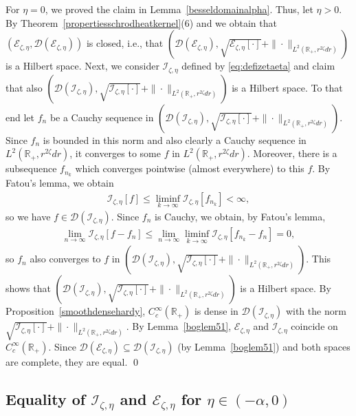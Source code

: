 \documentclass[12pt,reqno]{amsart}
\theoremstyle{definition}
\theoremstyle{remark}
\numberwithin{equation}{section}
\newcommand{\1}{\mathbbm{1}}
\newcommand{\D}{\mathcal{D}}
\newcommand{\R}{\mathbb{R}}
\def\ce{\mathcal{E}}
\def\ci{\mathcal{I}}
\begin{document}
For $\eta=0$, we proved the claim in Lemma~\ref{besseldomainalpha}. Thus, let $\eta>0$.
By Theorem~\ref{propertiesschrodheatkernel}(6) and \cite[Lemmas~1.3.2 and~1.3.4 and Theorem~1.3.1]{Fukushimaetal2011} we obtain that $(\ce_{\zeta,\eta},\D(\ce_{\zeta,\eta}))$ is closed, i.e., that $(\D(\ce_{\zeta,\eta}),\sqrt{\ce_{\zeta,\eta}[\cdot]}+\|\cdot\|_{L^2(\R_+,r^{2\zeta}dr)})$ is a Hilbert space.
%
Next, we consider $\ci_{\zeta,\eta}$ defined by \eqref{eq:defizetaeta} and claim that also $(\D(\ci_{\zeta,\eta}),\sqrt{\ci_{\zeta,\eta}[\cdot]}+\|\cdot\|_{L^2(\R_+,r^{2\zeta}dr)})$ is a Hilbert space. To that end let $f_n$ be a Cauchy sequence in $(\D(\ci_{\zeta,\eta}),\sqrt{\ci_{\zeta,\eta}[\cdot]}+\|\cdot\|_{L^2(\R_+,r^{2\zeta}dr)})$. Since $f_n$ is bounded in this norm and also clearly a Cauchy sequence in $L^2(\R_+,r^{2\zeta}dr)$, it converges to some $f$ in $L^2(\R_+,r^{2\zeta}dr)$. Moreover, there is a subsequence $f_{n_k}$ which converges pointwise (almost everywhere) to this $f$. By Fatou's lemma, we obtain
\begin{align}
  \ci_{\zeta,\eta}[f] \leq \liminf_{k\to\infty}\ci_{\zeta,\eta}[f_{n_k}] <\infty,
\end{align}
so we have $f\in\D(\ci_{\zeta,\eta})$. Since $f_n$ is Cauchy, we obtain, by Fatou's lemma,
\begin{align}
  \lim_{n\to\infty}\ci_{\zeta,\eta}[f-f_n]
  \leq \lim_{n\to\infty}\liminf_{k\to\infty} \ci_{\zeta,\eta}[f_{n_k}-f_n] = 0,
\end{align}
so $f_n$ also converges to $f$ in $(\D(\ci_{\zeta,\eta}),\sqrt{\ci_{\zeta,\eta}[\cdot]} + \|\cdot\|_{L^2(\R_+,r^{2\zeta}dr)})$. This shows that $(\D(\ci_{\zeta,\eta}),\sqrt{\ci_{\zeta,\eta}[\cdot]}+\|\cdot\|_{L^2(\R_+,r^{2\zeta}dr)})$ is a Hilbert space.
By Proposition~\ref{smoothdensehardy}, $C_c^\infty(\R_+)$ is dense in $\D(\ci_{\zeta,\eta})$ with the norm $\sqrt{\ci_{\zeta,\eta}[\cdot]}+\|\cdot\|_{L^2(\R_+,r^{2\zeta}dr)}$.
By Lemma~\ref{boglem51}, $\ce_{\zeta,\eta}$ and $\ci_{\zeta,\eta}$ coincide on $C_c^\infty(\R_+)$. Since $\D(\ce_{\zeta,\eta})\subseteq\D(\ci_{\zeta,\eta})$ (by Lemma~\ref{boglem51}) and both spaces are complete, they are equal. \qed



\subsection{Equality of $\ci_{\zeta,\eta}$ and $\ce_{\zeta,\eta}$ for $\eta\in(-\alpha,0)$}
\label{s:connectiongeneratorsjw}
\end{document}
